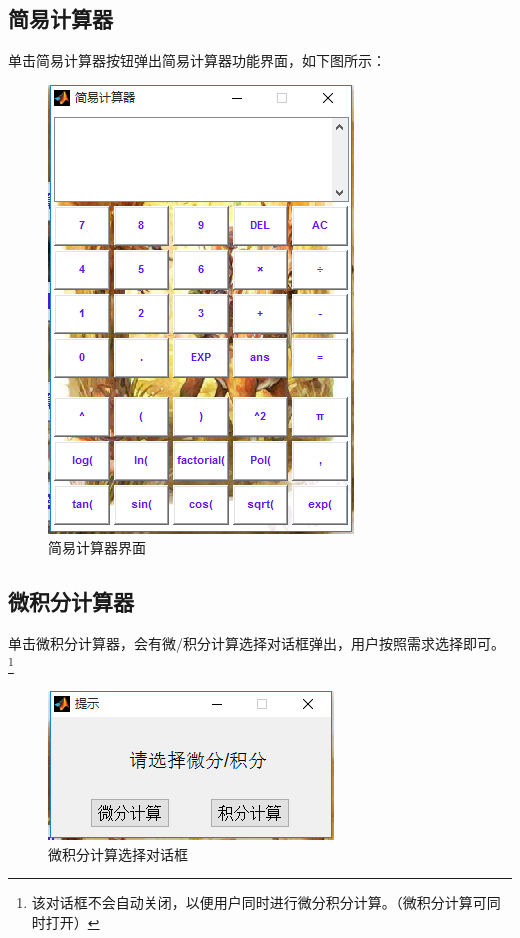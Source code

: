 \documentclass[UTF8]{ctexart}
\begin{document}
\bigskip

\subsection{简易计算器}
单击简易计算器按钮弹出简易计算器功能界面，如下图所示：
\begin{figure}[H]
\centering
\includegraphics[scale=0.5]{image/pic03.png}
\caption{简易计算器界面}
\label{fig:pic03}
\end{figure}

\subsection{微积分计算器}
单击微积分计算器，会有微/积分计算选择对话框弹出，用户按照需求选择即可。
\footnote{该对话框不会自动关闭，以便用户同时进行微分积分计算。（微积分计算可同时打开）}

\begin{figure}[H]
\centering
\includegraphics[scale=0.5]{image/pic04.png}
\caption{微积分计算选择对话框}
\label{fig:pic04}
\end{figure}
\end{document}

